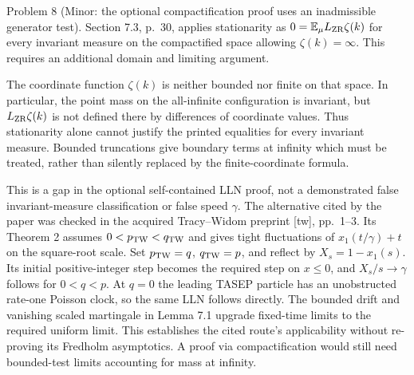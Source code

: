 \documentclass[10pt]{article}
\begin{document}
Problem 8 (Minor: the optional compactification proof uses an inadmissible generator test).  Section 7.3, p. 30, applies stationarity as \(0=\mathbb E_\mu L_{\rm ZR}\zeta(k)\) for every invariant measure on the compactified space allowing \(\zeta(k)=\infty\). This requires an additional domain and limiting argument.\par
The coordinate function \(\zeta(k)\) is neither bounded nor finite on that space. In particular, the point mass on the all-infinite configuration is invariant, but \(L_{\rm ZR}\zeta(k)\) is not defined there by differences of coordinate values. Thus stationarity alone cannot justify the printed equalities for every invariant measure. Bounded truncations give boundary terms at infinity which must be treated, rather than silently replaced by the finite-coordinate formula.\par
This is a gap in the optional self-contained LLN proof, not a demonstrated false invariant-measure classification or false speed \(\gamma\). The alternative cited by the paper was checked in the acquired Tracy–Widom preprint [tw], pp. 1–3. Its Theorem 2 assumes \(0<p_{\rm TW}<q_{\rm TW}\) and gives tight fluctuations of \(x_1(t/\gamma)+t\) on the square-root scale. Set \(p_{\rm TW}=q\), \(q_{\rm TW}=p\), and reflect by \(X_s=1-x_1(s)\). Its initial positive-integer step becomes the required step on \(x\leq0\), and \(X_s/s\to\gamma\) follows for \(0<q<p\). At \(q=0\) the leading TASEP particle has an unobstructed rate-one Poisson clock, so the same LLN follows directly. The bounded drift and vanishing scaled martingale in Lemma 7.1 upgrade fixed-time limits to the required uniform limit. This establishes the cited route’s applicability without re-proving its Fredholm asymptotics. A proof via compactification would still need bounded-test limits accounting for mass at infinity.\par
\end{document}
